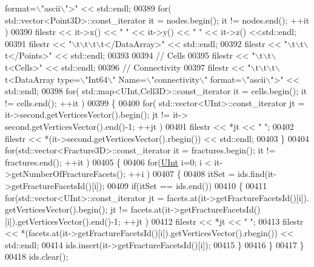 \begin{DoxyCode}
{       format=\(\backslash\)"ascii\(\backslash\)">"} << std::endl;
00389     \textcolor{keywordflow}{for}( std::vector<Point3D>::const\_iterator it = nodes.begin(); it != nodes.end(); ++it )
00390         filestr << it->x() << \textcolor{stringliteral}{" "} << it->y() << \textcolor{stringliteral}{" "} << it->z() <<std::endl;
00391     filestr << \textcolor{stringliteral}{"\(\backslash\)t\(\backslash\)t\(\backslash\)t\(\backslash\)t</DataArray>"} << std::endl;
00392     filestr << \textcolor{stringliteral}{"\(\backslash\)t\(\backslash\)t\(\backslash\)t</Points>"} << std::endl;
00393 
00394     \textcolor{comment}{// Cells}
00395     filestr << \textcolor{stringliteral}{"\(\backslash\)t\(\backslash\)t\(\backslash\)t<Cells>"} << std::endl;
00396     \textcolor{comment}{//  Connectivity}
00397     filestr << \textcolor{stringliteral}{"\(\backslash\)t\(\backslash\)t\(\backslash\)t\(\backslash\)t<DataArray type=\(\backslash\)"Int64\(\backslash\)" Name=\(\backslash\)"connectivity\(\backslash\)" format=\(\backslash\)"ascii\(\backslash\)">"} << std::endl;
00398     \textcolor{keywordflow}{for}( std::map<UInt,Cell3D>::const\_iterator it = cells.begin(); it != cells.end(); ++it )
00399     \{
00400         \textcolor{keywordflow}{for}( std::vector<UInt>::const\_iterator jt = it->second.getVerticesVector().begin(); jt != it->
      second.getVerticesVector().end()-1; ++jt )
00401             filestr << *jt << \textcolor{stringliteral}{" "};
00402         filestr << *(it->second.getVerticesVector().rbegin()) << std::endl;
00403     \}
00404     \textcolor{keywordflow}{for}(std::vector<Fracture3D>::const\_iterator it = fractures.begin(); it != fractures.end(); ++it )
00405     \{
00406         \textcolor{keywordflow}{for}(\hyperlink{namespaceFVCode3D_a4bf7e328c75d0fd504050d040ebe9eda}{UInt} i=0; i < it->getNumberOfFractureFacets(); ++i )
00407         \{
00408             itSet = ids.find(it->getFractureFacetsId()[i]);
00409             \textcolor{keywordflow}{if}(itSet == ids.end())
00410             \{
00411                 \textcolor{keywordflow}{for}(std::vector<UInt>::const\_iterator jt = facets.at(it->getFractureFacetsId()[i]).
      getVerticesVector().begin(); jt != facets.at(it->getFractureFacetsId()[i]).getVerticesVector().end()-1; ++jt )
00412                     filestr << *jt << \textcolor{stringliteral}{" "};
00413                 filestr << *(facets.at(it->getFractureFacetsId()[i]).getVerticesVector().rbegin()) << 
      std::endl;
00414                 ids.insert(it->getFractureFacetsId()[i]);
00415             \}
00416         \}
00417     \}
00418     ids.clear();

\end{DoxyCode}
